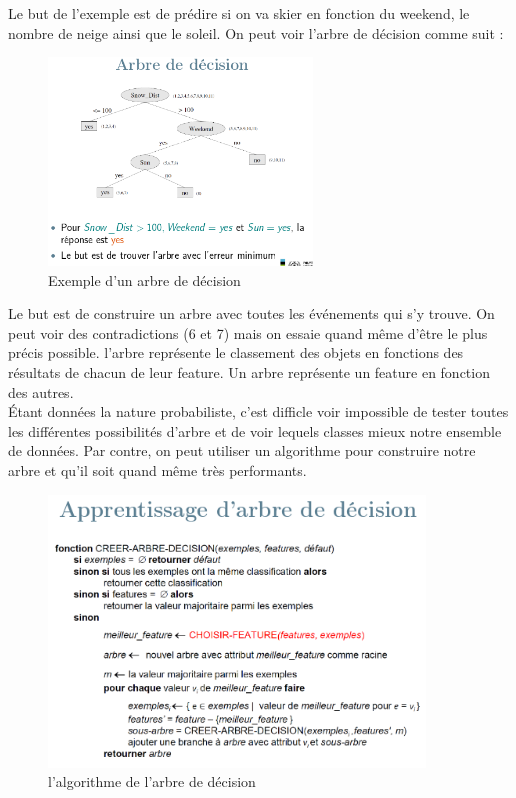 \documentclass[oneside]{book}
\begin{document}
Le but de l'exemple est de prédire si on va skier en fonction du weekend, le nombre de neige ainsi que le soleil. On peut voir l'arbre de décision comme suit :\\

\begin{figure}[!ht]
\centering
\includegraphics[width = 7cm]{decision_tree_example.png}
\caption{Exemple d'un arbre de décision}
\label{fig:decision_tree}
\end{figure}

Le but est de construire un arbre avec toutes les événements qui s'y trouve. On peut voir des contradictions (6 et 7) mais on essaie quand même d'être le plus précis possible. l'arbre représente le classement des objets en fonctions des résultats de chacun de leur feature. Un arbre représente un feature en fonction des autres.\\

Étant données la nature probabiliste, c'est difficle voir impossible de tester toutes les différentes possibilités d'arbre et de voir lequels classes mieux notre ensemble de données. Par contre, on peut utiliser un algorithme pour construire notre arbre et qu'il soit quand même très performants. \\

\begin{figure}[!ht]
\centering
\includegraphics[width = 10cm]{algo_decision.png}
\caption{l'algorithme de l'arbre de décision}
\end{figure}
\end{document}
